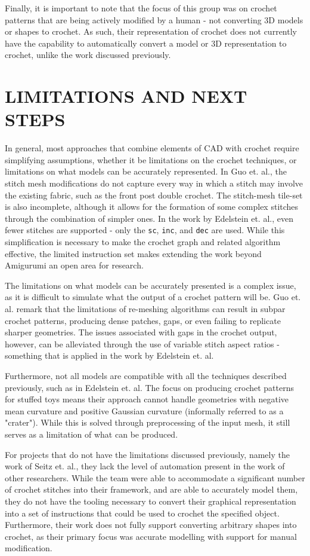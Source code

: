 \documentclass{IEEEcsmag}
\begin{document}
Finally, it is important to note that the focus of this group was on crochet
patterns that are being actively modified by a human - not converting 3D models
or shapes to crochet. As such, their representation of crochet does not
currently have the capability to automatically convert a model or 3D
representation to crochet, unlike the work discussed previously.

\section{LIMITATIONS AND NEXT STEPS}

In general, most approaches that combine elements of CAD with crochet require
simplifying assumptions, whether it be limitations on the crochet techniques,
or limitations on what models can be accurately represented. In Guo et. al.,
the stitch mesh modifications do not capture every way in which a stitch may
involve the existing fabric, such as the front post double crochet. The
stitch-mesh tile-set is also incomplete, although it allows for the formation
of some complex stitches through the combination of simpler ones. In the work
by Edelstein et. al., even fewer stitches are supported - only the \verb|sc|,
\verb|inc|, and \verb|dec| are used. While this simplification is necessary to
make the crochet graph and related algorithm effective, the limited instruction
set makes extending the work beyond Amigurumi an open area for research.

The limitations on what models can be accurately presented is a complex issue,
as it is difficult to simulate what the output of a crochet pattern will be.
Guo et. al. remark that the limitations of re-meshing algorithms can result in
subpar crochet patterns, producing dense patches, gaps, or even failing to
replicate sharper geometries. The issues associated with gaps in the crochet
output, however, can be alleviated through the use of variable stitch aspect
ratios - something that is applied in the work by Edelstein et. al.

Furthermore, not all models are compatible with all the techniques described
previously, such as in Edelstein et. al. The focus on producing crochet
patterns for stuffed toys means their approach cannot handle geometries with
negative mean curvature and positive Gaussian curvature (informally referred to
as a "crater"). While this is solved through preprocessing of the input mesh,
it still serves as a limitation of what can be produced.

For projects that do not have the limitations discussed previously, namely the
work of Seitz et. al., they lack the level of automation present in the work of
other researchers. While the team were able to accommodate a significant number
of crochet stitches into their framework, and are able to accurately model
them, they do not have the tooling necessary to convert their graphical
representation into a set of instructions that could be used to crochet the
specified object. Furthermore, their work does not fully support converting
arbitrary shapes into crochet, as their primary focus was accurate modelling
with support for manual modification.
\end{document}
